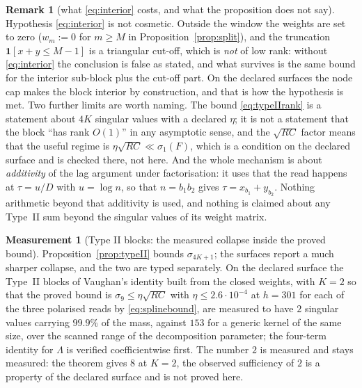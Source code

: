 \documentclass[11pt,a4paper]{article}
\theoremstyle{plain}
\theoremstyle{definition}
\newtheorem{remark}[theorem]{Remark}
\newtheorem{measurement}[theorem]{Measurement}
\begin{document}
\begin{remark}[what \eqref{eq:interior} costs, and what the proposition does not
say]
\label{rem:interior}
Hypothesis \eqref{eq:interior} is not cosmetic. Outside the window the weights
are set to zero ($w_m:=0$ for $m\ge M$ in Proposition~\ref{prop:split}), and the
truncation $\mathbf 1[x+y\le M-1]$ is a triangular cut-off, which is \emph{not}
of low rank: without \eqref{eq:interior} the conclusion is false as stated, and
what survives is the same bound for the interior sub-block plus the cut-off
part. On the declared surfaces the node cap makes the block interior by
construction, and that is how the hypothesis is met. Two further limits are
worth naming. The bound \eqref{eq:typeIIrank} is a statement about $4K$ singular
values with a declared $\eta$; it is not a statement that the block ``has rank
$O(1)$'' in any asymptotic sense, and the $\sqrt{RC}$ factor means that the
useful regime is $\eta\sqrt{RC}\ll\sigma_1(F)$, which is a condition on the
declared surface and is checked there, not here. And the whole mechanism is
about \emph{additivity} of the lag argument under factorisation: it uses that
the read happens at $\tau=u/D$ with $u=\log n$, so that $n=b_1b_2$ gives
$\tau=x_{b_1}+y_{b_2}$. Nothing arithmetic beyond that additivity is used, and
nothing is claimed about any Type~II sum beyond the singular values of its
weight matrix.
\end{remark}

\begin{measurement}[Type II blocks: the measured collapse inside the proved
bound]
\label{meas:typeII}
Proposition~\ref{prop:typeII} bounds $\sigma_{4K+1}$; the surfaces report a
much sharper collapse, and the two are typed separately. On the declared surface
the Type~II blocks of Vaughan's identity \cite{Vaughan1977} built from the
closed weights, with $K=2$ so that the proved bound is $\sigma_9\le\eta\sqrt{RC}$
with $\eta\le2.6\cdot10^{-4}$ at $h=301$ for each of the three polarised reads by
\eqref{eq:splinebound}, are measured
to have $2$ singular values carrying $99.9\%$ of the mass, against $153$ for a
generic kernel of the same size, over the scanned range of the decomposition
parameter; the four-term identity for $\Lambda$ is verified coefficientwise
first. The number $2$ is measured and stays measured: the theorem gives $8$ at
$K=2$, the observed sufficiency of $2$ is a property of the declared surface and
is not proved here.
\end{measurement}
\end{document}
